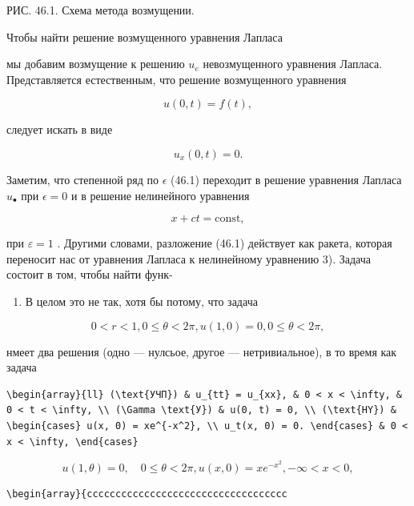 \documentclass[
  ukrainian,
]{article}
\providecommand{\tightlist}{%
  \setlength{\itemsep}{0pt}\setlength{\parskip}{0pt}}
\begin{document}
РИС. 46.1. Схема метода возмущении.

Чтобы найти решение возмущенного уравнения Лапласа

мы добавим возмущение к решению \(u_{\mathrm{ }e}\) невозмущенного
уравнения Лапласа. Представляется естественным, что решение возмущенного
уравнения

\[
u(0, t) = f(t),
\]

следует искать в виде

\[
u_{x}(0, t) = 0.
\]

Заметим, что степенной ряд по \(\epsilon\) (46.1) переходит в решение
уравнения Лапласа \(u_{\bullet}\) при \(\epsilon=0\) и в решение
нелинейного уравнения

\[
x + ct = \text{const},
\]

при \(\varepsilon = 1\) . Другими словами, разложение (46.1) действует
как ракета, которая переносит нас от уравнения Лапласа к нелинейному
уравнению 3). Задача состоит в том, чтобы найти функ-

\begin{enumerate}
\def\labelenumi{\arabic{enumi})}
\tightlist
\item
  В целом это не так, хотя бы потому, что задача
\end{enumerate}

\[
0 < r < 1,     0 \le \theta < 2\pi,     u(1, 0) = 0,     0 \le \theta < 2\pi,
\]

нмеет два решения (одно --- нулсьое, другое --- нетривиальное), в то
время как задача

\begin{verbatim}
\begin{array}{ll} (\text{УЧП}) & u_{tt} = u_{xx}, & 0 < x < \infty, & 0 < t < \infty, \\ (\Gamma \text{У}) & u(0, t) = 0, \\ (\text{HY}) & \begin{cases} u(x, 0) = xe^{-x^2}, \\ u_t(x, 0) = 0. \end{cases} & 0 < x < \infty, \end{cases}
\end{verbatim}

\[
u(1, \theta) = 0, \quad 0 \le \theta < 2\pi,
u(x, 0) = xe^{-x^2}, -\infty < x < 0,
\]

\begin{verbatim}
\begin{array}{ccccccccccccccccccccccccccccccccccc
\end{verbatim}
\end{document}
